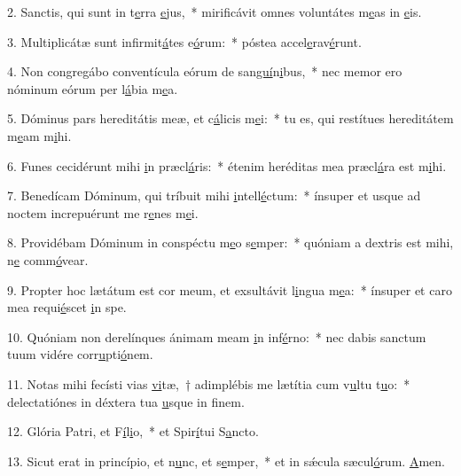2. Sanctis, qui sunt in t\uline{e}rra \uline{e}jus,~* mirificávit omnes voluntátes m\uline{e}as in \uline{e}is.\par 
3. Multiplicátæ sunt infirmit\uline{á}tes e\uline{ó}rum:~* póstea accel\uline{e}rav\uline{é}runt.\par 
4. Non congregábo conventícula eórum de san\uline{guí}n\uline{i}bus,~* nec memor ero nóminum eórum per l\uline{á}bia m\uline{e}a.\par 
5. Dóminus pars hereditátis meæ, et c\uline{á}licis m\uline{e}i:~* tu es, qui restítues hereditátem m\uline{e}am m\uline{i}hi.\par 
6. Funes cecidérunt mihi \uline{i}n præcl\uline{á}ris:~* étenim heréditas mea præcl\uline{á}ra est m\uline{i}hi.\par 
7. Benedícam Dóminum, qui tríbuit mihi \uline{i}ntell\uline{é}ctum:~* ínsuper et usque ad noctem increpuérunt me r\uline{e}nes m\uline{e}i.\par 
8. Providébam Dóminum in conspéctu m\uline{e}o s\uline{e}mper:~* quóniam a dextris est mihi, n\uline{e} comm\uline{ó}vear.\par 
9. Propter hoc lætátum est cor meum, et exsultávit l\uline{i}ngua m\uline{e}a:~* ínsuper et caro mea requi\uline{é}scet \uline{i}n spe.\par 
10. Quóniam non derelínques ánimam meam \uline{i}n inf\uline{é}rno:~* nec dabis sanctum tuum vidére corr\uline{u}pti\uline{ó}nem.\par 
11. Notas mihi fecísti vias \uline{vi}tæ,~† adimplébis me lætítia cum v\uline{u}ltu t\uline{u}o:~* delectatiónes in déxtera tua \uline{u}sque in f\uline{i}nem.\par 
12. Glória Patri, et F\uline{í}l\uline{i}o,~* et Spir\uline{í}tui S\uline{a}ncto.\par 
13. Sicut erat in princípio, et n\uline{u}nc, et s\uline{e}mper,~* et in sǽcula sæcul\uline{ó}rum. \uline{A}men.\par 
